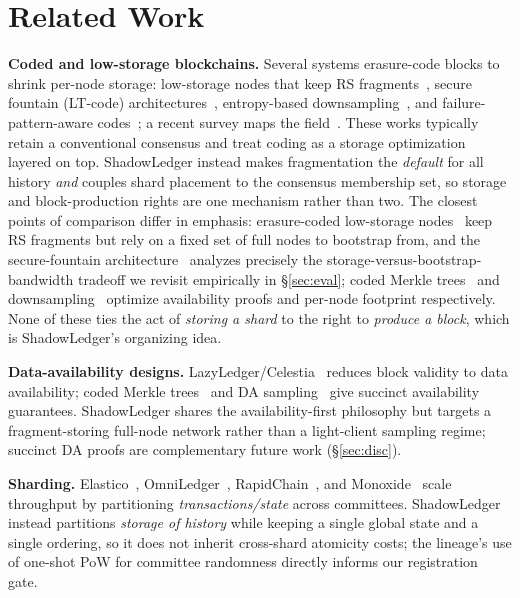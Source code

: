 \section{Related Work}
\label{sec:related}
\textbf{Coded and low-storage blockchains.} Several systems erasure-code blocks to shrink
per-node storage: low-storage nodes that keep RS fragments~\cite{perard2018erasure}, secure
fountain (LT-code) architectures~\cite{kadhe2019sef}, entropy-based
downsampling~\cite{huang2022downsampling}, and failure-pattern-aware
codes~\cite{mitra2019patterned}; a recent survey maps the field~\cite{yang2024scaling}. These
works typically retain a conventional consensus and treat coding as a storage optimization
layered on top. ShadowLedger instead makes fragmentation the \emph{default} for all history
\emph{and} couples shard placement to the consensus membership set, so storage and
block-production rights are one mechanism rather than two. The closest points of comparison
differ in emphasis: erasure-coded low-storage nodes~\cite{perard2018erasure} keep RS fragments
but rely on a fixed set of full nodes to bootstrap from, and the secure-fountain
architecture~\cite{kadhe2019sef} analyzes precisely the storage-versus-bootstrap-bandwidth
tradeoff we revisit empirically in \S\ref{sec:eval}; coded Merkle trees~\cite{yu2020coded} and
downsampling~\cite{huang2022downsampling} optimize availability proofs and per-node footprint
respectively. None of these ties the act of \emph{storing a shard} to the right to \emph{produce
a block}, which is ShadowLedger's organizing idea.

\textbf{Data-availability designs.} LazyLedger/Celestia~\cite{albassam2019lazyledger} reduces
block validity to data availability; coded Merkle trees~\cite{yu2020coded} and DA
sampling~\cite{hallandersen2025foundations,hallandersen2024frida} give succinct availability
guarantees. ShadowLedger shares the availability-first philosophy but targets a
fragment-storing full-node network rather than a light-client sampling regime; succinct DA
proofs are complementary future work (\S\ref{sec:disc}).

\textbf{Sharding.} Elastico~\cite{luu2016elastico}, OmniLedger~\cite{kokoriskogias2018omniledger},
RapidChain~\cite{zamani2018rapidchain}, and Monoxide~\cite{wang2019monoxide} scale throughput by
partitioning \emph{transactions/state} across committees. ShadowLedger instead partitions
\emph{storage of history} while keeping a single global state and a single ordering, so it does
not inherit cross-shard atomicity costs; the lineage's use of one-shot PoW for committee
randomness directly informs our registration gate.

